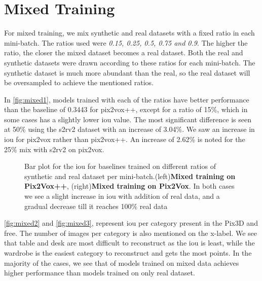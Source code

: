 \section{Mixed Training}\label{sec:mixed-training}
For mixed training, we mix synthetic and real datasets with a fixed ratio in each mini-batch.
The ratios used were \emph{0.15, 0.25, 0.5, 0.75 and 0.9}.
The higher the ratio, the closer the mixed dataset becomes a real dataset.
Both the real and synthetic datasets were drawn according to these ratios for each mini-batch.
The synthetic dataset is much more abundant than the real, so the real dataset will be oversampled to achieve the mentioned ratios.

In \autoref{fig:mixed1}, models trained with each of the ratios have better performance than the baseline of 0.3443 for pix2vox++,
except for a ratio of 15\%, which in some cases has a slightly lower \gls{iou}  value.
The most significant difference is seen at 50\% using the \gls{s2rv2} dataset with an increase of 3.04\%.
We saw an increase in \gls{iou} for pix2vox rather than pix2vox++.
An increase of 2.62\% is noted for the 25\% mix with \gls{s2rv2} on pix2vox.

\begin{figure}[ht]
    \centering
    \resizebox{0.49\linewidth}{0.45\linewidth}{}
    \resizebox{0.49\linewidth}{0.45\linewidth}{}
    \caption{Bar plot for the \gls{iou} for baselines trained on different ratios of synthetic and real dataset per mini-batch.(left)\textbf{Mixed training on Pix2Vox++}, (right)\textbf{Mixed training on Pix2Vox}.
    In both cases we see a slight increase in \gls{iou} with addition of real data, and a gradual decrease till it reaches 100\% real data}
    \label{fig:mixed1}
\end{figure}

\autoref{fig:mixed2} and \autoref{fig:mixed3}, represent \gls{iou} per category present in the Pix3D and \gls{free}.
The number of images per category is also mentioned on the x-label.
We see that table and desk are most difficult to reconstruct as the \gls{iou} is least, while the wardrobe is the easiest category to reconstruct and gets the most points.
In the majority of the cases, we see that  of models trained on mixed data achieves higher performance than models trained on only real dataset.

